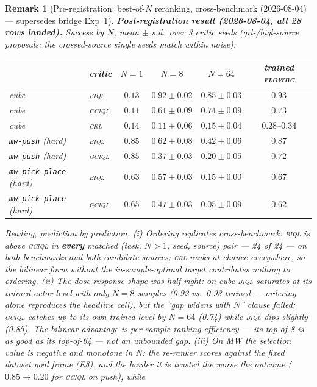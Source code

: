 \documentclass[10pt]{article}
\newtheorem{remark}{Remark}
\begin{document}
\begin{remark}[Pre-registration: best-of-$N$ reranking, cross-benchmark (2026-08-04) ---
supersedes bridge Exp~1]
\medskip
\noindent\textbf{Post-registration result (2026-08-04, all 28 rows landed).} Success by $N$,
mean $\pm$ s.d.\ over 3 critic seeds (qrl-/biql-source proposals; the crossed-source single
seeds match within noise):
\begin{center}
\small
\begin{tabular}{llccc c}
\toprule
 & critic & $N{=}1$ & $N{=}8$ & $N{=}64$ & trained \textsc{flowbc} \\
\midrule
cube & \textsc{biql} & $0.13$ & $\mathbf{0.92\pm0.02}$ & $0.85\pm0.03$ & $0.93$ \\
cube & \textsc{gciql} & $0.11$ & $0.61\pm0.09$ & $0.74\pm0.09$ & $0.73$ \\
cube & \textsc{crl} & $0.14$ & $0.11\pm0.06$ & $0.15\pm0.04$ & $0.28$--$0.34$ \\
\texttt{mw-push} (hard) & \textsc{biql} & $0.85$ & $0.62\pm0.08$ & $0.42\pm0.06$ & $0.87$ \\
\texttt{mw-push} (hard) & \textsc{gciql} & $0.85$ & $0.37\pm0.03$ & $0.20\pm0.05$ & $0.72$ \\
\texttt{mw-pick-place} (hard) & \textsc{biql} & $0.63$ & $0.57\pm0.03$ & $0.15\pm0.00$ & $0.67$ \\
\texttt{mw-pick-place} (hard) & \textsc{gciql} & $0.65$ & $0.47\pm0.03$ & $0.05\pm0.09$ & $0.62$ \\
\bottomrule
\end{tabular}
\end{center}
Reading, prediction by prediction. (i) \emph{Ordering replicates cross-benchmark}:
\textsc{biql} is above \textsc{gciql} in \textbf{every} matched (task, $N{>}1$, seed,
source) pair --- 24 of 24 --- on both benchmarks and both candidate sources; \textsc{crl}
ranks at chance everywhere, so the bilinear \emph{form} without the in-sample-optimal
target contributes nothing to ordering. (ii) \emph{The dose-response shape was
half-right}: on cube \textsc{biql} saturates at its trained-actor level with only
$N{=}8$ samples (0.92 vs.\ 0.93 trained --- ordering alone reproduces the headline cell),
but the ``gap widens with $N$'' clause failed: \textsc{gciql} \emph{catches up} to its own
trained level by $N{=}64$ (0.74) while \textsc{biql} dips slightly (0.85). The bilinear
advantage is per-sample ranking efficiency --- its top-of-8 is as good as its top-of-64 ---
not an unbounded gap. (iii) \emph{On MW the selection value is negative and monotone in
$N$}: the re-ranker scores against the fixed dataset goal frame (E8), and the harder it is
trusted the worse the outcome ($0.85\to0.20$ for \textsc{gciql} on push), while

\end{remark}
\end{document}
